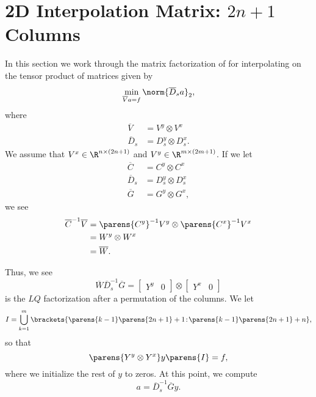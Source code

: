\section{2D \CV{} Interpolation Matrix: $2n+1$ Columns}
\label{sec:CV_2D_2n}

In this section we work through the matrix factorization
of for interpolating on the tensor product of \CV{}
matrices given by
%
\begin{equation}
    \min_{\overline{V}a=f} \norm{\overline{D}_{s}a}_{2},
\end{equation}
%
where
%
\begin{align}
    \overline{V} &= V^{y}\otimes V^{x} \nonumber\\
    \overline{D}_{s} &= D_{s}^{y} \otimes D_{s}^{x}.
\end{align}
%
We assume that $V^{x}\in\R^{n\times(2n+1)}$ and $V^{y}\in\R^{m\times(2m+1)}$.
If we let
%
\begin{align}
    \overline{C} &= C^{y} \otimes C^{x} \nonumber\\
    \overline{D}_{s} &= D_{s}^{y} \otimes D_{s}^{x} \nonumber\\
    \overline{G} &= G^{y} \otimes G^{x},
\end{align}
%
we see
%
\begin{align}
    \overline{C}^{-1}\overline{V}
        &= \parens{C^{y}}^{-1}V^{y} \otimes \parens{C^{x}}^{-1}V^{x}
            \nonumber\\
        &= W^{y} \otimes W^{x} \nonumber\\
        &= \overline{W}.
\end{align}

Thus, we see
%
\begin{equation}
    \overline{W} \overline{D}_{s}^{-1} \overline{G}
        = \begin{bmatrix} Y^{y} & 0 \end{bmatrix} \otimes
            \begin{bmatrix} Y^{x} & 0 \end{bmatrix}
\end{equation}
%
is the $LQ$ factorization after a permutation of the columns.
We let
%
\begin{equation}
    I = \bigcup_{k=1}^{m}
        \brackets{\parens{k-1}\parens{2n+1}+1\!:\!\parens{k-1}\parens{2n+1}+n},
\end{equation}
%
so that
%
\begin{equation}
    \parens{Y^{y}\otimes Y^{x}}y\parens{I} = f,
\end{equation}
%
where we initialize the rest of $y$ to zeros.
At this point, we compute
%
\begin{equation}
    a = \overline{D}_{s}^{-1}\overline{G}y.
\end{equation}



